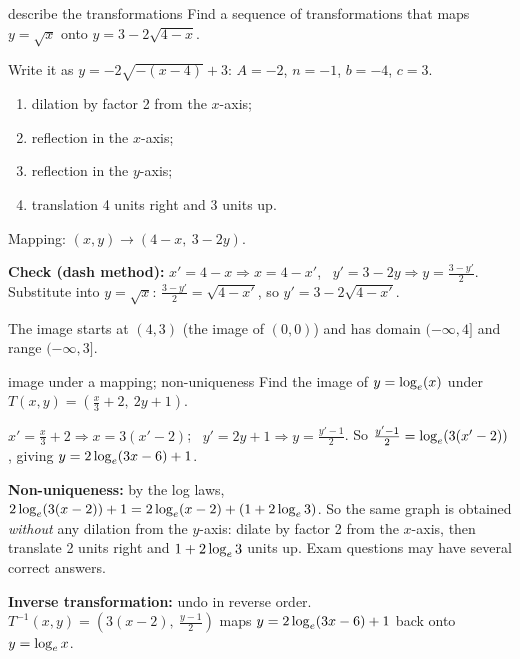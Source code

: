 \begin{cols}[0.6]
\begin{example}{describe the transformations \byhand}
Find a sequence of transformations that maps $y=\sqrt{x}$ onto $y=3-2\sqrt{4-x}$.\par
Write it as $y=-2\sqrt{-(x-4)}+3$: $A=-2$, $n=-1$, $b=-4$, $c=3$.
\begin{enumerate}
  \item dilation by factor 2 from the $x$-axis;
  \item reflection in the $x$-axis;
  \item reflection in the $y$-axis;
  \item translation 4 units right and 3 units up.
\end{enumerate}
Mapping: $(x,y)\to(4-x,\ 3-2y)$.\par
\textbf{Check (dash method):} $x'=4-x\Rightarrow x=4-x'$, \ $y'=3-2y\Rightarrow y=\frac{3-y'}{2}$. Substitute into $y=\sqrt x$: $\frac{3-y'}{2}=\sqrt{4-x'}$, so $y'=3-2\sqrt{4-x'}$. \tick
\end{example}
\nextcol[0.37]
\centering
{}

{\scriptsize The image starts at $(4,3)$ (the image of $(0,0)$) and has domain $(-\infty,4]$ and range $(-\infty,3]$.}
\end{cols}

\begin{example}{image under a mapping; non-uniqueness}
Find the image of $y=\log_e(x)$ under $T(x,y)=\left(\frac{x}{3}+2,\ 2y+1\right)$.\par
$x'=\frac x3+2\Rightarrow x=3(x'-2)$; \ $y'=2y+1\Rightarrow y=\frac{y'-1}{2}$. So $\frac{y'-1}{2}=\log_e(3(x'-2))$, giving $y=2\log_e(3x-6)+1$.\par
\textbf{Non-uniqueness:} by the log laws, $2\log_e(3(x-2))+1=2\log_e(x-2)+(1+2\log_e3)$. So the same graph is obtained \emph{without} any dilation from the $y$-axis: dilate by factor 2 from the $x$-axis, then translate 2 units right and $1+2\log_e3$ units up. Exam questions may have several correct answers.\par
\textbf{Inverse transformation:} undo in reverse order. $T^{-1}(x,y)=\left(3(x-2),\ \frac{y-1}{2}\right)$ maps $y=2\log_e(3x-6)+1$ back onto $y=\log_e x$.
\end{example}


